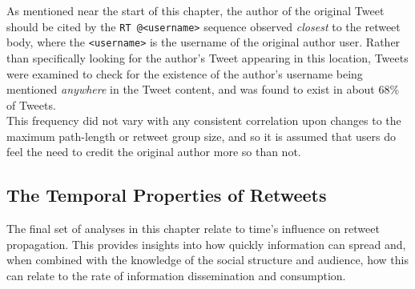 As mentioned near the start of this chapter, the author of the original Tweet should be cited by the \texttt{RT @<username>} sequence observed \textit{closest} to the retweet body, where the \texttt{<username>} is the username of the original author user. Rather than specifically looking for the author's Tweet appearing in this location, Tweets were examined to check for the existence of the author's username being mentioned \textit{anywhere} in the Tweet content, and was found to exist in about 68\% of Tweets.\\
This frequency did not vary with any consistent correlation upon changes to the maximum path-length or retweet group size, and so it is assumed that users do feel the need to credit the original author more so than not. 

 
\subsection{The Temporal Properties of Retweets}
The final set of analyses in this chapter relate to time's influence on retweet propagation. This provides insights into how quickly information can spread and, when combined with the knowledge of the social structure and audience, how this can relate to the rate of information dissemination and consumption.



